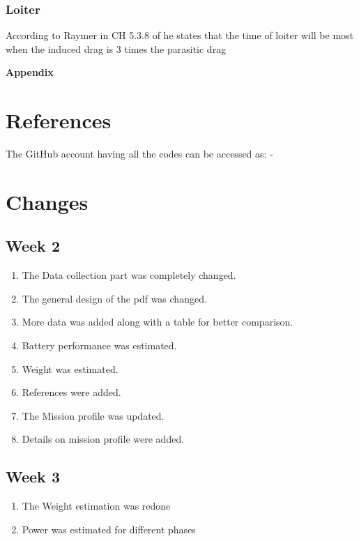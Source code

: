 \documentclass[12 pt]{article}
\begin{document}
\subsubsection{Loiter}

According to Raymer in CH 5.3.8 of \cite{Raymer.2006} he states that the time of loiter will be most when the induced drag is 3 times the parasitic drag

\newpage
\textbf{\Huge{Appendix}}
\appendix


\section{References}




\vspace{10 pt}

The GitHub account having all the codes can be accessed as: - 

\href{https://github.com/abhijeetmangela/Group_7_design.git}{}

\newpage

\section{Changes}

\subsection{Week 2}
\begin{enumerate}
    \item The Data collection part was completely changed.
    \item The general design of the pdf was changed.
    \item More data was added along with a table for better comparison.
    \item Battery performance was estimated.
    \item Weight was estimated.
    \item References were added.
    \item The Mission profile was updated.
    \item Details on mission profile were added.
\end{enumerate}

\subsection{Week 3}
\begin{enumerate}
    \item The Weight estimation was redone
    \item Power was estimated for different phases 
\end{enumerate}
\end{document}
